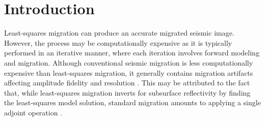 \section{Introduction}
Least-squares migration can produce an accurate migrated seismic image.
However, the process may be computationally expensive as it is typically performed in an iterative manner, where each iteration involves forward modeling and migration. 
Although conventional seismic migration is less computationally expensive than least-squares migration, it generally contains migration artifacts affecting amplitude fidelity and resolution \cite[]{lsamp,pwlsrtm}.
This may be attributed to the fact that, while least-squares migration inverts for subsurface reflectivity by 
finding the least-squares model solution,
standard migration amounts to applying a single adjoint operation \cite[]{pvi}. 

